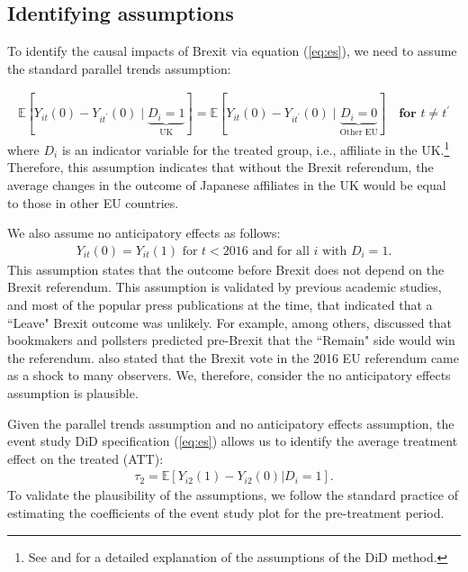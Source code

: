 \documentclass[preprint,11pt,authoryear]{elsarticle}
\begin{document}

\subsection{Identifying assumptions}
To identify the causal impacts of Brexit via equation (\ref{eq:es}), we need to assume the standard parallel trends assumption: 

\begin{align}\label{eq:pt}
\mathbb{E}\left[{Y_{i t}(0)}
-{Y_{i t^{\prime}}(0)} \mid \underbrace{D_{i}=1}_{\text{UK}} \right]
=
{\mathbb{E}\left[Y_{i t}(0)-Y_{i t^{\prime}}(0) \mid \underbrace{D_{i}=0}_{\text{Other EU}} \right]} 
\quad \textbf{for } t \neq t^{\prime} 
\end{align}
where $D_{i}$ is an indicator variable for the treated group, i.e., affiliate in the UK.\footnote{
See \cite{callaway2023difference} and \cite{roth2023survey} for a detailed explanation of the assumptions of the DiD method.
} 
Therefore, this assumption indicates that without the Brexit referendum, the average changes in the outcome of Japanese affiliates in the UK would be equal to those in other EU countries.

We also assume no anticipatory effects as follows:
\begin{align}
{Y_{i t}(0)}
=
Y_{i t}(1)  \text{ for } t < 2016 \text{ and for all } i \text { with } D_{i}=1.
\end{align}
This assumption states that the outcome before Brexit does not depend on the Brexit referendum. This assumption is validated by previous academic studies, and most of the popular press publications at the time, that indicated that a ``Leave" Brexit outcome was unlikely. For example, among others, \cite{becker_who_2017} discussed that bookmakers and pollsters predicted pre-Brexit that the ``Remain" side would win the referendum. \cite{alabrese_who_2019} also stated that the Brexit vote in the 2016 EU referendum came as a shock to many observers. We, therefore, consider the no anticipatory effects assumption is plausible.


Given the parallel trends assumption and no anticipatory effects assumption, the event study DiD specification (\ref{eq:es}) allows us to identify the average treatment effect on the treated (ATT):
\begin{align}
\tau _{2} = \mathbb{E} [ Y_{i2}(1) - Y_{i2}(0) | D_{i} = 1].
\end{align}
To validate the plausibility of the assumptions, we follow the standard practice of estimating the coefficients of the event study plot for the pre-treatment period.
\end{document}
